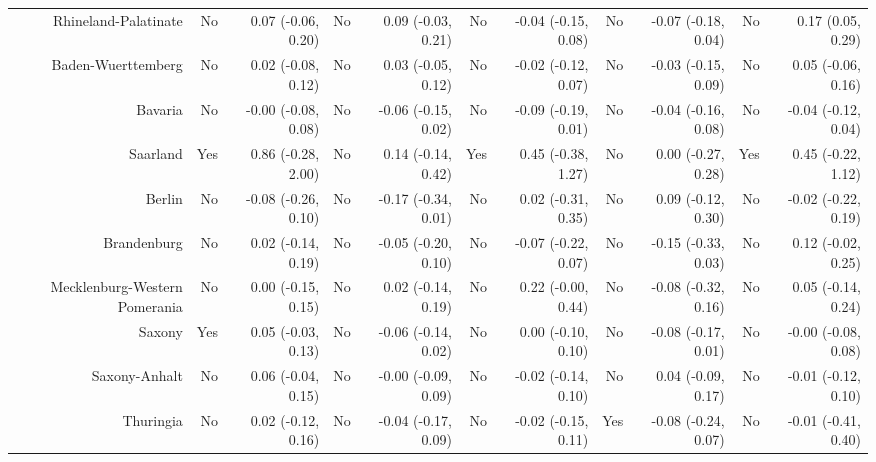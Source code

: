 \documentclass[
  man,floatsintext]{apa6}
\newenvironment{lltable}{\begin{landscape}\centering\begin{ThreePartTable}}{\end{ThreePartTable}\end{landscape}}
\begin{document}
\begin{lltable}
{\begin{longtable}{rrrrrrrrrrr}
Rhineland-Palatinate & No & 0.07 (-0.06, 0.20) & No & 0.09 (-0.03, 0.21) & No & -0.04 (-0.15, 0.08) & No & -0.07 (-0.18, 0.04) & No & 0.17 (0.05, 0.29)\\
Baden-Wuerttemberg & No & 0.02 (-0.08, 0.12) & No & 0.03 (-0.05, 0.12) & No & -0.02 (-0.12, 0.07) & No & -0.03 (-0.15, 0.09) & No & 0.05 (-0.06, 0.16)\\
Bavaria & No & -0.00 (-0.08, 0.08) & No & -0.06 (-0.15, 0.02) & No & -0.09 (-0.19, 0.01) & No & -0.04 (-0.16, 0.08) & No & -0.04 (-0.12, 0.04)\\
Saarland & Yes & 0.86 (-0.28, 2.00) & No & 0.14 (-0.14, 0.42) & Yes & 0.45 (-0.38, 1.27) & No & 0.00 (-0.27, 0.28) & Yes & 0.45 (-0.22, 1.12)\\
Berlin & No & -0.08 (-0.26, 0.10) & No & -0.17 (-0.34, 0.01) & No & 0.02 (-0.31, 0.35) & No & 0.09 (-0.12, 0.30) & No & -0.02 (-0.22, 0.19)\\
Brandenburg & No & 0.02 (-0.14, 0.19) & No & -0.05 (-0.20, 0.10) & No & -0.07 (-0.22, 0.07) & No & -0.15 (-0.33, 0.03) & No & 0.12 (-0.02, 0.25)\\
Mecklenburg-Western Pomerania & No & 0.00 (-0.15, 0.15) & No & 0.02 (-0.14, 0.19) & No & 0.22 (-0.00, 0.44) & No & -0.08 (-0.32, 0.16) & No & 0.05 (-0.14, 0.24)\\
Saxony & Yes & 0.05 (-0.03, 0.13) & No & -0.06 (-0.14, 0.02) & No & 0.00 (-0.10, 0.10) & No & -0.08 (-0.17, 0.01) & No & -0.00 (-0.08, 0.08)\\
Saxony-Anhalt & No & 0.06 (-0.04, 0.15) & No & -0.00 (-0.09, 0.09) & No & -0.02 (-0.14, 0.10) & No & 0.04 (-0.09, 0.17) & No & -0.01 (-0.12, 0.10)\\
Thuringia & No & 0.02 (-0.12, 0.16) & No & -0.04 (-0.17, 0.09) & No & -0.02 (-0.15, 0.11) & Yes & -0.08 (-0.24, 0.07) & No & -0.01 (-0.41, 0.40)\\
\bottomrule
\end{longtable}

}

\end{lltable}
\end{document}
